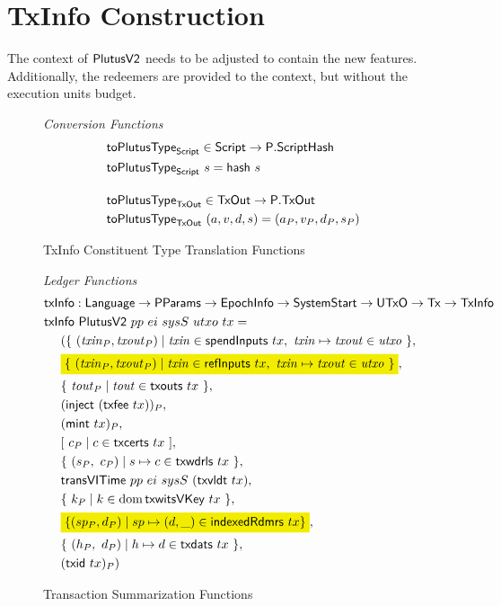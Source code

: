 \section{TxInfo Construction}
\label{sec:txinfo}

The context of $\mathsf{PlutusV2}$ needs to be adjusted to contain the new
features. Additionally, the redeemers are provided to the context, but
without the execution units budget.

\begin{figure*}[htb]
  \emph{Conversion Functions}
  \begin{align*}
    & \fun{toPlutusType}_{\Script} \in \Script \to \type{P.ScriptHash} \\
    & \fun{toPlutusType}_{\Script}~ s = \fun{hash}~s
    \nextdef
    & \fun{toPlutusType}_{\TxOut} \in \TxOut \to \type{P.TxOut} \\
    & \fun{toPlutusType}_{\TxOut}~ (a, v, d, s) = (a_P, v_P, d_P, s_P)
  \end{align*}
  \caption{TxInfo Constituent Type Translation Functions}
  \label{fig:txinfo-translations}
\end{figure*}

\begin{figure}
    \emph{Ledger Functions}
    \begin{align*}
        &\fun{txInfo} : \Language \to \PParams \to \EpochInfo \to \SystemStart \to \UTxO \to \Tx \to \TxInfo \\
        &\fun{txInfo}~\PlutusVII~pp~ ei~ sysS~ utxo~tx = \\
        & ~~~~ (\{~(\var{txin}_P, \var{txout}_P) \mid \var{txin}\in\fun{spendInputs}~tx,~\var{txin}\mapsto\var{txout}\in\var{utxo}~\}, \\
        & ~~~~ \hldiff{\{~(\var{txin}_P, \var{txout}_P) \mid \var{txin}\in\fun{refInputs}~tx,~\var{txin}\mapsto\var{txout}\in\var{utxo}~\}}, \\
        & ~~~~ \{~\var{tout}_P\mid\var{tout}\in\fun{txouts}~{tx}~\} , \\
        & ~~~~ (\fun{inject}~(\fun{txfee}~{tx}))_P, \\
        & ~~~~ (\fun{mint}~{tx})_P , \\
        & ~~~~ [~ c_P \mid c \in \fun{txcerts}~{tx} ~] , \\
        & ~~~~ \{~(s_P,~c_P)\mid s\mapsto c \in \fun{txwdrls}~{tx}~\} , \\
        & ~~~~ \fun{transVITime} ~pp ~ei~ sysS~ (\fun{txvldt}~tx)  , \\
        & ~~~~ \{~k_P\mid k \in \dom \fun{txwitsVKey}~{tx}~\} , \\
        & ~~~~ \hldiff{\{ (sp_P, d_P) \mid sp \mapsto (d, \_) \in \fun{indexedRdmrs}~tx \}}, \\
        & ~~~~ \{~(h_P,~d_P)\mid h\mapsto d \in \fun{txdats}~{tx}~\} , \\
        & ~~~~ (\fun{txid}~{tx})_P)
    \end{align*}
  \caption{Transaction Summarization Functions}
  \label{fig:txinfo-funcs}
\end{figure}
